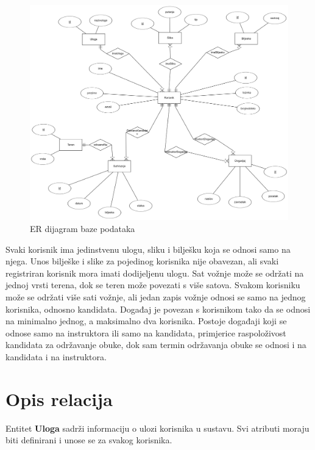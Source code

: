 \begin{figure}[H]
					\includegraphics[width=\textwidth]{slike/ERBaza.png} 
					\centering
					\caption{ER dijagram baze podataka}
					\label{fig:promjene}
				\end{figure}




\noindent Svaki korisnik ima jedinstvenu ulogu, sliku i bilješku koja se odnosi samo na njega. Unos bilješke i slike za pojedinog korisnika nije obavezan, ali svaki registriran korisnik mora imati dodijeljenu ulogu. Sat vožnje može se održati na jednoj vrsti terena, dok se teren može povezati s više satova. Svakom korisniku može se održati više sati vožnje, ali jedan zapis vožnje odnosi se samo na jednog korisnika, odnosno kandidata. Događaj je povezan s korisnikom tako da se odnosi na minimalno jednog, a maksimalno dva korisnika. Postoje događaji koji se odnose samo na instruktora ili samo na kandidata, primjerice raspoloživost kandidata za održavanje obuke, dok sam termin održavanja obuke se odnosi i na kandidata i na instruktora. 


\section{Opis relacija}




 
 \noindent Entitet \textbf{Uloga}  sadrži informaciju o ulozi korisnika u sustavu. Svi atributi moraju biti definirani i unose se za svakog korisnika.


